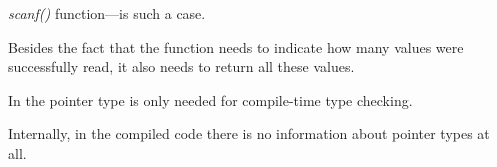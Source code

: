 \emph{scanf()} function---is such a case.

Besides the fact that the function needs to indicate how many values were successfully read, it also needs to return all these values.

In \CCpp the pointer type is only needed for compile-time type checking.

Internally, in the compiled code there is no information about pointer types at all.





